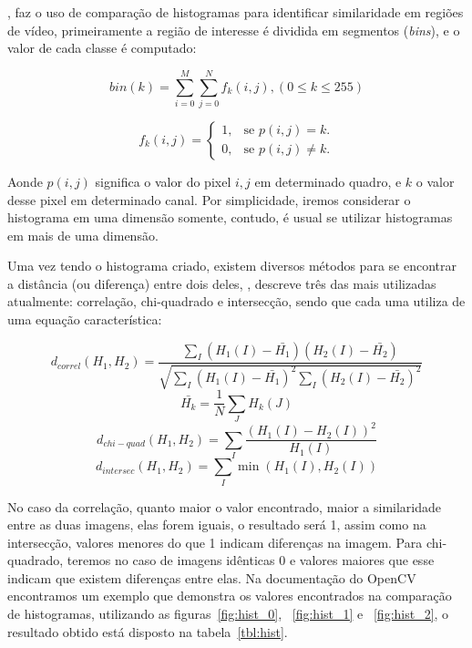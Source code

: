 \documentclass[ecp,tc]{iiufrgs}
\begin{document}
, faz o uso de comparação de histogramas para identificar similaridade em regiões de vídeo, primeiramente a região de interesse é dividida em segmentos (\textit{bins}), e o valor de cada classe é computado:

\[
bin(k) = \sum_{i=0}^{M}\sum_{j=0}^{N}f_k(i,j),(0 \le k \le 255)
\]

\begin{equation}
f_k(i,j)=\begin{cases}
1, & \text{se $p(i,j) = k$}.\\
0, & \text{se $p(i,j) \neq k$}.
\end{cases}
\end{equation}

Aonde $ p(i,j) $ significa o valor do pixel $ i, j$ em determinado quadro, e $ k $ o valor desse pixel em determinado canal. Por simplicidade, iremos considerar o histograma em uma dimensão somente, contudo, é usual se utilizar histogramas em mais de uma dimensão.

Uma vez tendo o histograma criado, existem diversos métodos para se encontrar a distância (ou diferença) entre dois deles, , descreve três das mais utilizadas atualmente: correlação, chi-quadrado e intersecção, sendo que cada uma utiliza de uma equação característica:

\[
d_{correl}(H_1,H_2) =  \frac{\sum_I (H_1(I) - \bar{H_1}) (H_2(I) - \bar{H_2})}{\sqrt{\sum_I(H_1(I) - \bar{H_1})^2 \sum_I(H_2(I) - \bar{H_2})^2}}
\]
\[
\bar{H_k} =  \frac{1}{N} \sum _J H_k(J)
\]
\[
d_{chi-quad}(H_1,H_2) =  \sum _I  \frac{\left(H_1(I)-H_2(I)\right)^2}{H_1(I)}
\]
\[
d_{intersec}(H_1,H_2) =  \sum _I  \min (H_1(I), H_2(I))
\]

No caso da correlação, quanto maior o valor encontrado, maior a similaridade entre as duas imagens, elas forem iguais, o resultado será 1, assim como na intersecção, valores menores do que 1 indicam diferenças na imagem. Para chi-quadrado, teremos no caso de imagens idênticas 0 e valores maiores que esse indicam que existem diferenças entre elas. Na documentação do OpenCV encontramos um exemplo que demonstra os valores encontrados na comparação de histogramas, utilizando as figuras~\ref{fig:hist_0}, ~\ref{fig:hist_1} e ~\ref{fig:hist_2}, o resultado obtido está disposto na tabela~\ref{tbl:hist}.
\end{document}
